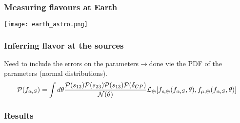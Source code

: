 \documentclass{beamer}
\begin{document}
	\begin{frame}
		\frametitle{Measuring flavours at Earth}
		\begin{center}
			\texttt{[image: earth\_astro.png]}
		\end{center}
	\end{frame}
	\begin{frame}
		\frametitle{Inferring flavor at the sources}
		Need to include the errors on the parameters$\rightarrow$done vie the PDF of the parameters (normal distributions).
		$$\displaystyle\mathcal{P}(f_{\alpha,S})=\int d\theta{\mathcal{P}(s_{12})\mathcal{P}(s_{23})\mathcal{P}(s_{13})\mathcal{P}(\delta_{CP})\over \mathcal{N}(\theta)}\mathcal{L}_\oplus[f_{e,\oplus}(f_{\alpha,S},\theta),f_{\mu,\oplus}(f_{\alpha,S},\theta)]$$
	\end{frame}
	\begin{frame}
		\frametitle{Results}
	\end{frame}
\end{document}
